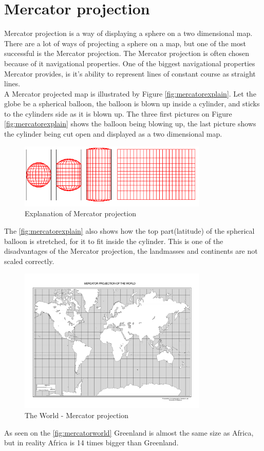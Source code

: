 \section{Mercator projection}
\label{sec:mercatorprojection}
Mercator projection is a way of displaying a sphere on a two dimensional map.
There are a lot of ways of projecting a sphere on a map, but one of the most successful is the Mercator projection. The Mercator projection is often chosen because of it navigational properties. One of the biggest navigational properties Mercator provides, is it's ability to represent lines of constant course as straight lines.\\
A Mercator projected map is illustrated by Figure \autoref{fig:mercatorexplain}. Let the globe be a spherical balloon, the balloon is blown up inside a cylinder, and sticks to the cylinders side as it is blown up. The three first pictures on Figure \autoref{fig:mercatorexplain} shows the balloon being blowing up, the last picture shows the cylinder being cut open and displayed as a two dimensional map.
\begin{figure}[H]
\centering
\includegraphics[width=0.8\textwidth]{img/mercatorexplain.png}
\caption{Explanation of Mercator projection \citep{mercatorexplain}}
\label{fig:mercatorexplain}
\end{figure}
The \autoref{fig:mercatorexplain} also shows how the top part(latitude) of the spherical balloon is stretched, for it to fit inside the cylinder. This is one of the disadvantages of the Mercator projection, the landmasses and continents are not scaled correctly.
\begin{figure}[H]
\centering
\includegraphics[width=0.8\textwidth]{img/mercatorworld.pdf}
\caption{The World - Mercator projection  \citep{mercatorworld}}
\label{fig:mercatorworld}
\end{figure} As seen on the \autoref{fig:mercatorworld} Greenland is almost the same size as Africa, but in reality Africa is 14 times bigger than Greenland.

